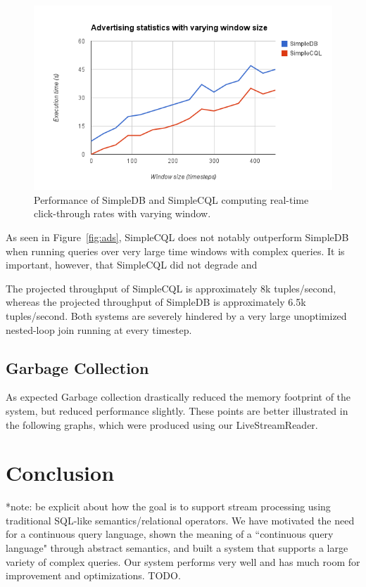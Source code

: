 \documentclass[a4paper, 10pt, conference]{IEEEconf}
\begin{document}
\begin{figure}[tpH!]
    \centering
    \centerline{\includegraphics[totalheight=5cm]{ads_window.png}}
    \caption{Performance of SimpleDB and SimpleCQL computing real-time click-through rates with varying window.}
    \label{fig:ads_window}
\end{figure}

As seen in Figure~\ref{fig:ads}, SimpleCQL does not notably outperform SimpleDB when running queries over very large time windows with complex queries.  It is important, however, that SimpleCQL did not degrade and 

The projected throughput of SimpleCQL is approximately 8k tuples/second, whereas the projected throughput of SimpleDB is approximately 6.5k tuples/second.  Both systems are severely hindered by a very large unoptimized nested-loop join running at every timestep.

\subsection{Garbage Collection}
As expected Garbage collection drastically reduced the memory footprint of the system, but reduced performance slightly. These points are better illustrated in the following graphs, which were produced using our LiveStreamReader.

\section{Conclusion}
*note: be explicit about how the goal is to support stream processing using traditional SQL-like semantics/relational operators. We have motivated the need for a continuous query language, shown the meaning of a ``continuous query language" through abstract semantics, and built a system that supports a large variety of complex queries.  Our system performs very well and has much room for improvement and optimizations.  TODO.



\end{document}
